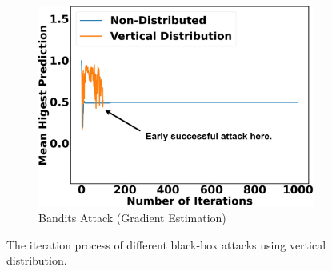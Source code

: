 \begin{figure}[tp]
\begin{subfigure}[b]{0.6\textwidth}
    \includegraphics[width=\textwidth]{figures/chapter_classification/bandits_attack_vertical_margin.png}
    \caption{Bandits Attack (Gradient Estimation)}
    \label{fig:bandits_plot}
\end{subfigure}
\caption{The iteration process of different black-box attacks using vertical distribution.}
\label{fig.vertical_plot}
\end{figure}


